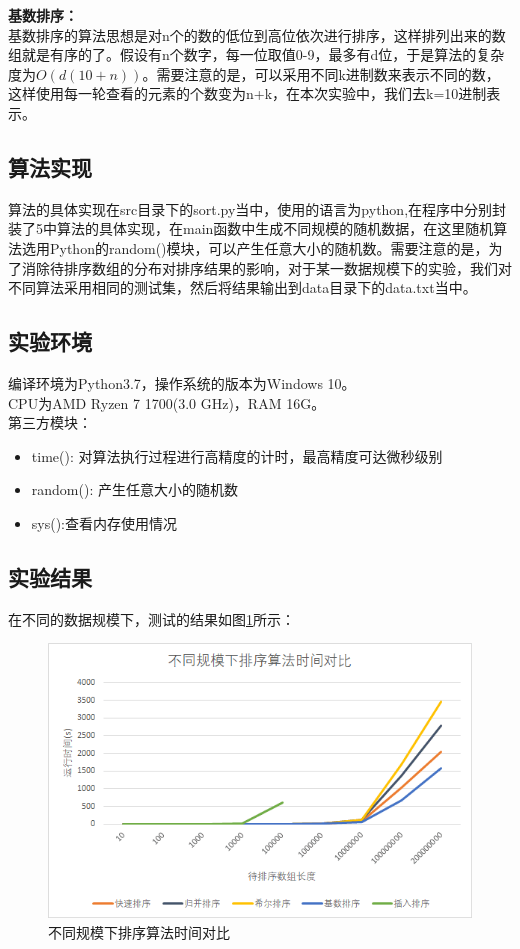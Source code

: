 \documentclass[UTF8]{ctexart}
\begin{document}
\textbf{基数排序：}\\
基数排序的算法思想是对n个的数的低位到高位依次进行排序，这样排列出来的数组就是有序的了。假设有n个数字，每一位取值0-9，最多有d位，于是算法的复杂度为$O(d(10+n))$。需要注意的是，可以采用不同k进制数来表示不同的数，这样使用每一轮查看的元素的个数变为n+k，在本次实验中，我们去k=10进制表示。

\subsection{算法实现}

算法的具体实现在src目录下的sort.py当中，使用的语言为python,在程序中分别封装了5中算法的具体实现，在main函数中生成不同规模的随机数据，在这里随机算法选用Python的random()模块，可以产生任意大小的随机数。需要注意的是，为了消除待排序数组的分布对排序结果的影响，对于某一数据规模下的实验，我们对不同算法采用相同的测试集，然后将结果输出到data目录下的data.txt当中。

\subsection{实验环境}
编译环境为Python3.7，操作系统的版本为Windows 10。\\
CPU为AMD Ryzen 7 1700(3.0 GHz)，RAM 16G。\\
第三方模块：
\begin{itemize}
\item time(): 对算法执行过程进行高精度的计时，最高精度可达微秒级别
\item random(): 产生任意大小的随机数
\item sys():查看内存使用情况
\end{itemize}

\subsection{实验结果}
在不同的数据规模下，测试的结果如图\ref{compare}所示：

\begin{figure}[H]
    \centering
    \includegraphics[width=1\textwidth]{img/compare.png}
    \caption{不同规模下排序算法时间对比}
    \label{compare}
\end{figure}
\end{document}
